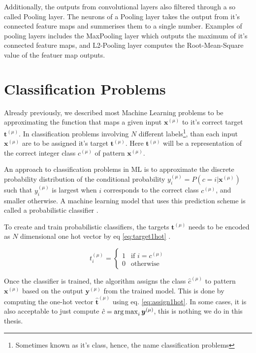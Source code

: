 Additionally, the outputs from convolutional layers also filtered through a so called Pooling layer. The neurons of a Pooling layer takes the output from it's connected feature maps and summerises them to a single number. Examples of pooling layers includes the MaxPooling layer which outputs the maximum of it's connected feature maps, and L2-Pooling layer computes the Root-Mean-Square value of the featuer map outputs\cite{mehligcourseslides}.

\section{Classification Problems}

Already previously, we described most Machine Learning problems to be approximating the function that maps a given input $\bm{x}^{(\mu)}$ to it's correct target $\bm{t}^{(\mu)}$. In classification problems involving $N$ different labels\footnote{Sometimes known as it's class, hence, the name classification problems}, than each input $\bm{x}^{(\mu)}$ are to be assigned it's target $\bm{t}^{(\mu)}$. Here $\bm{t}^{(\mu)}$ will be a representation of the correct integer class $c^{(\mu)}$ of pattern $\bm{x}^{(\mu)}$. 

An approach to classification problems in ML is to approximate the discrete probability distribution of the conditional probability $y_i^{(\mu)} = P(c = i | \bm{x}^{(\mu)})$ such that $y_i^{(\mu)}$ is largest when $i$ corresponds to the correct class $c^{(\mu)}$, and smaller otherwise. A machine learning model that uses this prediction scheme is called a probabilistic classifier \cite{rogers2016first}.

To create and train probabilistic classifiers, the targets $\bm{t}^{(\mu)}$ needs to be encoded as $N$ dimensional one hot vector by eq \eqref{eq:target1hot} \cite{mehligcourseslides}.

\begin{equation}
    \label{eq:target1hot}
    t_i^{(\mu)} = 
    \begin{cases}
        1 & \text{if } i = c^{(\mu)}\\
        0 & \text{otherwise}
    \end{cases}
\end{equation}

Once the classifier is trained, the algorithm assigns the class $\hat{c}^{(\mu)}$ to pattern $\bm{x}^{(\mu)}$ based on the output $\bm{y}^{(\mu)}$ from the trained model. This is done by computing the one-hot vector $\hat{\bm{t}}^{(\mu)}$ using eq. \eqref{eq:assign1hot}. In some cases, it is also acceptable to just compute $\hat{c} = \operatorname*{arg\,max}_i \bm{y}^{(\mu)}$, this is nothing we do in this thesis.

